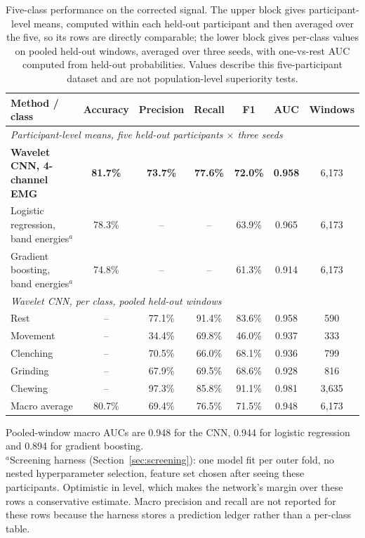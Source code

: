 \documentclass[pdflatex,sn-nature,iicol]{sn-jnl}
\begin{document}
\begin{table}[t]
  \centering
  \caption{Five-class performance on the corrected signal. The upper block gives participant-level means, computed within each held-out participant and then averaged over the five, so its rows are directly comparable; the lower block gives per-class values on pooled held-out windows, averaged over three seeds, with one-vs-rest AUC computed from held-out probabilities. Values describe this five-participant dataset and are not population-level superiority tests.}
  \label{tab:results}
  \small
  \begin{tabular*}{\textwidth}{@{\extracolsep{\fill}}lcccccc@{}}
    \toprule
    Method / class & Accuracy & Precision & Recall & F1 & AUC & Windows \\
    \midrule
    \multicolumn{7}{l}{\emph{Participant-level means, five held-out participants $\times$ three seeds}}\\
    \textbf{Wavelet CNN, 4-channel EMG} & \textbf{81.7\%} & \textbf{73.7\%} & \textbf{77.6\%} & \textbf{72.0\%} & \textbf{0.958} & 6,173 \\
    Logistic regression, band energies$^{a}$ & 78.3\% & -- & -- & 63.9\% & 0.965 & 6,173 \\
    Gradient boosting, band energies$^{a}$ & 74.8\% & -- & -- & 61.3\% & 0.914 & 6,173 \\
    \midrule
    \multicolumn{7}{l}{\emph{Wavelet CNN, per class, pooled held-out windows}}\\
    Rest & -- & 77.1\% & 91.4\% & 83.6\% & 0.958 & 590 \\
    Movement & -- & 34.4\% & 69.8\% & 46.0\% & 0.937 & 333 \\
    Clenching & -- & 70.5\% & 66.0\% & 68.1\% & 0.936 & 799 \\
    Grinding & -- & 67.9\% & 69.5\% & 68.6\% & 0.928 & 816 \\
    Chewing & -- & 97.3\% & 85.8\% & 91.1\% & 0.981 & 3,635 \\
    Macro average & 80.7\% & 69.4\% & 76.5\% & 71.5\% & 0.948 & 6,173 \\
    \bottomrule
  \end{tabular*}
  \begin{flushleft}\footnotesize
  Pooled-window macro AUCs are 0.948 for the CNN, 0.944 for logistic regression and 0.894 for gradient boosting.\\
  $^{a}$Screening harness (Section~\ref{sec:screening}): one model fit per outer fold, no nested hyperparameter selection, feature set chosen after seeing these participants. Optimistic in level, which makes the network's margin over these rows a conservative estimate. Macro precision and recall are not reported for these rows because the harness stores a prediction ledger rather than a per-class table.
  \end{flushleft}
\end{table}
\end{document}
